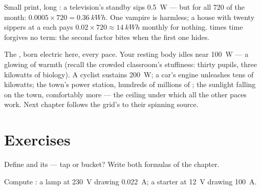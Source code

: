\begin{example}\label{ex:g9:electric-power-energy:standby}
Small print, long : a television's standby  sips
\qty{0.5}{W} --- but for all $720$  of the month:
$0.0005 \times 720 = \qty{0.36}{kWh}$. One vampire is
harmless; a house with twenty sippers at a  each pays
$0.02 \times 720 \approx \qty{14}{kWh}$ monthly for
nothing.  times time forgives no term: the second
factor bites when the first one hides.
\end{example}

\begin{remark}\label{rem:g9:electric-power-energy:wider}
The , born electric here,  every  pace.
Your resting body idles near \qty{100}{W} --- a glowing
 of warmth (recall the crowded classroom's
stuffiness: thirty pupils, three kilowatts of biology). A
cyclist sustains \qty{200}{W}; a car's engine unleashes
tens of kilowatts; the town's power station, hundreds of
millions of ; the sunlight falling on the town,
comfortably more --- the ceiling under which all the other
paces work. Next chapter follows the grid's  to their
spinning source.
\end{remark}

\section{Exercises}

\begin{exercise}[$\star$]\label{exo:g9:electric-power-energy:1}
Define  and its  --- tap or bucket? Write both
formulas of the chapter.
\end{exercise}

\begin{exercise}[$\star$]\label{exo:g9:electric-power-energy:2}
Compute : a lamp at \qty{230}{V} drawing
\qty{0.022}{A}; a starter  at \qty{12}{V} drawing
\qty{100}{A}.
\end{exercise}

